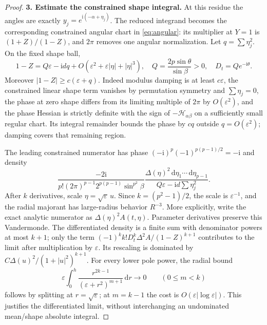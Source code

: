 \documentclass[11pt]{article}
\numberwithin{equation}{section}
\theoremstyle{definition}
\newcommand{\dd}{\,\mathrm d}
\newcommand{\ii}{\mathrm i}
\newcommand{\eps}{\varepsilon}
\newcommand{\Hpair}{\mathcal H_{\alpha\beta}}
\begin{document}
\begin{proof}
\par\smallskip\noindent\textbf{3. Estimate the constrained shape integral.} At this residue the angles are exactly $y_j=e^{\ii(-\alpha+\eta_j)}$.
The reduced integrand becomes the corresponding constrained
angular chart in \eqref{eq:angular}: its multiplier at $Y=1$ is
$(1+Z)/(1-Z)$, and $2\pi$ removes one angular normalization.
Let $q=\sum\eta_j^2$. On the fixed shape ball,
\begin{equation}
 1-Z=Q\eps-\ii d q+
 O(\eps^2+\eps|\eta|+|\eta|^3),\quad
 Q=\frac{2p\sin\theta}{\sin\beta}>0,
 \quad D_t=Qe^{-\ii\theta}.
 \label{eq:localdenom}
\end{equation}
Moreover $|1-Z|\ge c(\eps+q)$. Indeed modulus damping is at
least $c\eps$, the constrained linear shape term vanishes by
permutation symmetry and $\sum\eta_j=0$, the phase at zero shape
differs from its limiting multiple of $2\pi$ by $O(\eps^2)$,
and the phase Hessian is
strictly definite with the sign of $-\Hpair$ on a sufficiently
small regular chart. Its integral remainder bounds the phase by
$cq$ outside $q=O(\eps^2)$; damping covers that remaining region.

The leading constrained numerator has phase
$(-\ii)^p(-1)^{p(p-1)/2}=-\ii$ and density
\[
 \frac{-2\ii}{p!(2\pi)^{p-1}2^{p(p-1)}\sin^{p^2}\beta}
 \frac{\Delta(\eta)^2\dd\eta_1\cdots\dd\eta_{p-1}}
 {Q\eps-\ii d\sum\eta_j^2}.
\]
After $k$ derivatives, scale $\eta=\sqrt\eps\,u$. Since
$k=(p^2-1)/2$, the scale is $\eps^{-1}$, and the radial
majorant has large-radius behavior $R^{-3}$. More explicitly,
write the exact analytic numerator as $\Delta(\eta)^2A(t,\eta)$.
Parameter derivatives preserve this Vandermonde. The differentiated
density is a finite sum with denominator powers at most $k+1$;
only the term $(-1)^k k!D_t^k\Delta^2A/(1-Z)^{k+1}$ contributes
to the limit after multiplication by $\eps$. Its rescaling is
dominated by $C\Delta(u)^2/(1+|u|^2)^{k+1}$.
For every lower pole power, the radial bound
\[
 \eps\int_0^h\frac{r^{2k-1}}{(\eps+r^2)^{m+1}}\dd r
 \longrightarrow0\qquad(0\le m<k)
\]
follows by splitting at $r=\sqrt\eps$; at $m=k-1$ the cost is
$O(\eps|\log\eps|)$. This justifies the differentiated limit,
without interchanging an undominated mean/shape absolute integral.


\end{proof}
\end{document}
